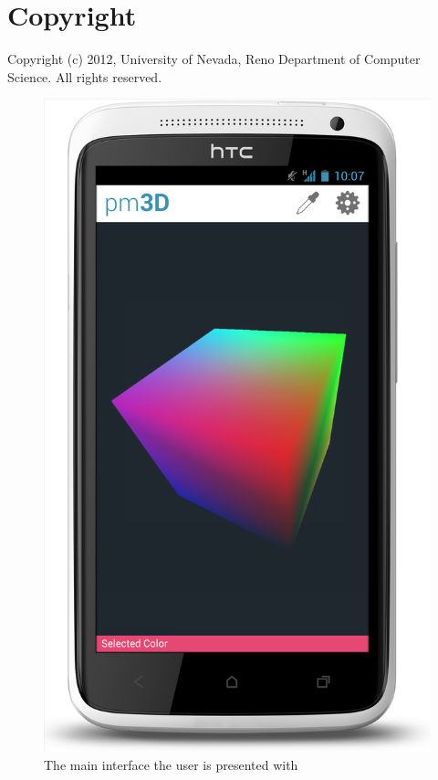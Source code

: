 \documentclass{chi-ext}
\begin{document}
\section{Copyright}

Copyright (c) 2012, University of Nevada, Reno Department of Computer Science.
All rights reserved.

\pagebreak

\begin{figure} %
\parbox{1\columnwidth}{

\centering \includegraphics[width=0.9\columnwidth]{main.png} \caption{The main
interface the user is presented with} \label{fig:maininterface} } \end{figure}
\end{document}
